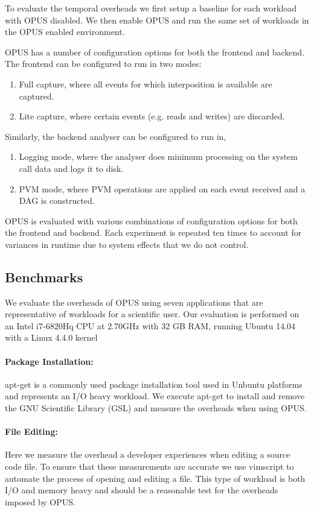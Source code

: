 \documentclass[withindex,glossary]{cam-thesis}
\begin{document}
To evaluate the temporal overheads we first setup a baseline for each workload with OPUS disabled.
We then enable OPUS and run the same set of workloads in the OPUS enabled environment.

OPUS has a number of configuration options for both the frontend and backend.
The frontend can be configured to run in two modes:
\begin{enumerate}
\item Full capture, where all events for which interposition is available are captured.
\item Lite capture, where certain events (e.g. reads and writes) are discarded.
\end{enumerate}

Similarly, the backend analyser can be configured to run in,
\begin{enumerate}
\item Logging mode, where the analyser does minimum processing on the system call data and logs it to disk.
\item PVM mode, where PVM operations are applied on each event received and a DAG is constructed.
\end{enumerate}

OPUS is evaluated with various combinations of configuration options for both the frontend and backend.
Each experiment is repeated ten times to account for variances in runtime due to system effects that we do not control.

\subsection{Benchmarks}
We evaluate the overheads of OPUS using seven applications that are representative of workloads for a scientific user.
Our evaluation is performed on an Intel i7-6820Hq CPU at 2.70GHz with 32 GB RAM, running Ubuntu 14.04 with a Linux 4.4.0 kernel

\paragraph{Package Installation:} apt-get is a commonly used package installation tool used in Unbuntu platforms and represents an I/O heavy workload.
We execute apt-get to install and remove the GNU Scientific Library (GSL) and measure the overheads when using OPUS.

\paragraph{File Editing:} Here we measure the overhead a developer experiences when editing a source code file.
To ensure that these measurements are accurate we use vimscript to automate the process of opening and editing a file.
This type of workload is both I/O and memory heavy and should be a reasonable test for the overheads imposed by OPUS.
\end{document}
